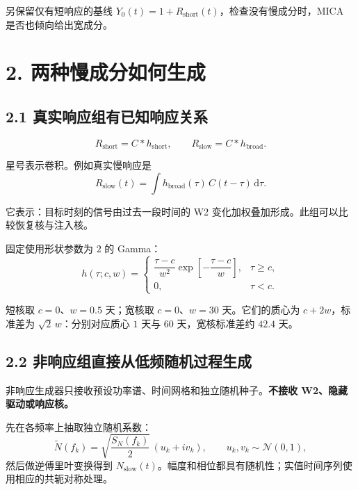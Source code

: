 \documentclass[11pt,a4paper]{article}
\newcommand{\dd}{\,\mathrm{d}}
\begin{document}
{\zhfont 另保留仅有短响应的基线} $Y_0(t)=1+R_{\mathrm{short}}(t)${\zhfont ，检查没有慢成分时，}MICA {\zhfont 是否也倾向给出宽成分。}

\newpage
\section*{2. {\zhfont 两种慢成分如何生成}}

\subsection*{2.1 {\zhfont 真实响应组有已知响应关系}}

\begin{equation}
R_{\mathrm{short}}=C*h_{\mathrm{short}},\qquad
R_{\mathrm{slow}}=C*h_{\mathrm{broad}}.
\end{equation}

{\zhfont 星号表示卷积。例如真实慢响应是}
\begin{equation}
R_{\mathrm{slow}}(t)=
\int h_{\mathrm{broad}}(\tau)\,C(t-\tau)\dd\tau.
\end{equation}

{\zhfont 它表示：目标时刻的信号由过去一段时间的} W2 {\zhfont 变化加权叠加形成。此组可以比较恢复核与注入核。}

{\zhfont 固定使用形状参数为} $2$ {\zhfont 的} Gamma{\zhfont ：}
\begin{equation}
h(\tau;c,w)=
\begin{cases}
\dfrac{\tau-c}{w^2}\exp\!\left[-\dfrac{\tau-c}{w}\right],&\tau\ge c,\\
0,&\tau<c.
\end{cases}
\end{equation}

{\zhfont 短核取} $c=0${\zhfont 、}$w=0.5$ {\zhfont 天；宽核取} $c=0${\zhfont 、}$w=30$ {\zhfont 天。它们的质心为} $c+2w${\zhfont ，标准差为} $\sqrt{2}\,w${\zhfont ：分别对应质心} $1$ {\zhfont 天与} $60$ {\zhfont 天，宽核标准差约} $42.4$ {\zhfont 天。}

\subsection*{2.2 {\zhfont 非响应组直接从低频随机过程生成}}

{\zhfont 非响应生成器只接收预设功率谱、时间网格和独立随机种子。}\textbf{{\zhfont 不接收} W2{\zhfont 、隐藏驱动或响应核。}}

{\zhfont 先在各频率上抽取独立随机系数：}
\begin{equation}
\widetilde N(f_k)=
\sqrt{\frac{S_N(f_k)}{2}}\,(u_k+i v_k),
\qquad u_k,v_k\sim\mathcal N(0,1),
\end{equation}
{\zhfont 然后做逆傅里叶变换得到} $N_{\mathrm{slow}}(t)${\zhfont 。幅度和相位都具有随机性；实值时间序列使用相应的共轭对称处理。}
\end{document}
